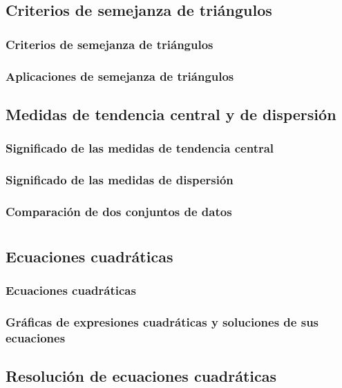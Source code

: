 \documentclass[11pt]{book}
\begin{document}
\section{Criterios de semejanza de triángulos}
\subsection{Criterios de semejanza de triángulos}
\subsection{Aplicaciones de semejanza de triángulos}

\section{Medidas de tendencia central y de dispersión}
\subsection{Significado de las medidas de tendencia central}
\subsection{Significado de las medidas de dispersión}
\subsection{Comparación de dos conjuntos de datos}


\chapter{}

\section{Ecuaciones cuadráticas}
\subsection{Ecuaciones cuadráticas}
\subsection{Gr\'aficas de expresiones cuadráticas y soluciones de sus ecuaciones}

\section{Resolución de ecuaciones cuadráticas}
\end{document}
